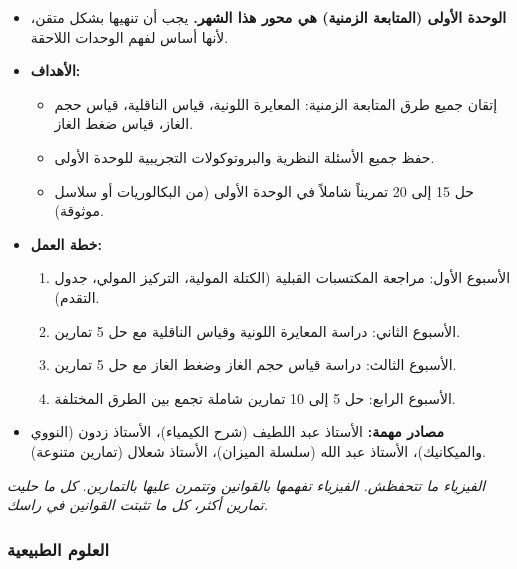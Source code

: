 \documentclass[12pt,a4paper]{book}
\newcommand{\quoteAr}[1]{%
	\begin{myquote}
		\itshape #1
	\end{myquote}
}
\begin{document}
	\begin{itemize}
		\item \textbf{الوحدة الأولى (المتابعة الزمنية) هي محور هذا الشهر.} يجب أن تنهيها بشكل متقن، لأنها أساس لفهم الوحدات اللاحقة.
		\item \textbf{الأهداف:}
		\begin{itemize}
			\item إتقان جميع طرق المتابعة الزمنية: المعايرة اللونية، قياس الناقلية، قياس حجم الغاز، قياس ضغط الغاز.
			\item حفظ جميع الأسئلة النظرية والبروتوكولات التجريبية للوحدة الأولى.
			\item حل 15 إلى 20 تمريناً شاملاً في الوحدة الأولى (من البكالوريات أو سلاسل موثوقة).
		\end{itemize}
		\item \textbf{خطة العمل:}
		\begin{enumerate}
			\item الأسبوع الأول: مراجعة المكتسبات القبلية (الكتلة المولية، التركيز المولي، جدول التقدم).
			\item الأسبوع الثاني: دراسة المعايرة اللونية وقياس الناقلية مع حل 5 تمارين.
			\item الأسبوع الثالث: دراسة قياس حجم الغاز وضغط الغاز مع حل 5 تمارين.
			\item الأسبوع الرابع: حل 5 إلى 10 تمارين شاملة تجمع بين الطرق المختلفة.
		\end{enumerate}
		\item \textbf{مصادر مهمة:} الأستاذ عبد اللطيف (شرح الكيمياء)، الأستاذ زدون (النووي والميكانيك)، الأستاذ عبد الله (سلسلة الميزان)، الأستاذ شعلال (تمارين متنوعة).
	\end{itemize}
	
	\quoteAr{الفيزياء ما تتحفظش. الفيزياء تفهمها بالقوانين وتتمرن عليها بالتمارين. كل ما حليت تمارين أكثر، كل ما تثبتت القوانين في راسك.}
	
	\subsubsection{العلوم الطبيعية}
	
\end{document}
